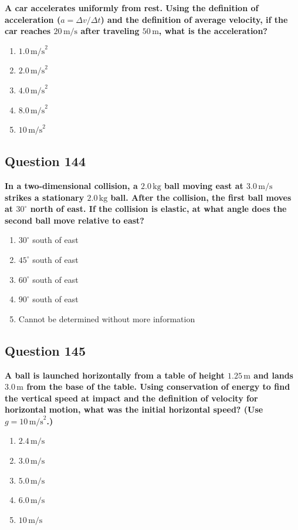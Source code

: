 \documentclass[12pt,letterpaper]{article}
\begin{document}
\begin{questionbox}
\textbf{A car accelerates uniformly from rest. Using the definition of acceleration ($a = \Delta v/\Delta t$) and the definition of average velocity, if the car reaches $20\,\text{m/s}$ after traveling $50\,\text{m}$, what is the acceleration?}

\begin{enumerate}[label=\alph*)]
    \item $1.0\,\text{m/s}^2$
    \item $2.0\,\text{m/s}^2$
    \item $4.0\,\text{m/s}^2$
    \item $8.0\,\text{m/s}^2$
    \item $10\,\text{m/s}^2$
\end{enumerate}
\end{questionbox}

\subsection{Question 144}

\begin{questionbox}
\textbf{In a two-dimensional collision, a $2.0\,\text{kg}$ ball moving east at $3.0\,\text{m/s}$ strikes a stationary $2.0\,\text{kg}$ ball. After the collision, the first ball moves at $30^\circ$ north of east. If the collision is elastic, at what angle does the second ball move relative to east?}

\begin{enumerate}[label=\alph*)]
    \item $30^\circ$ south of east
    \item $45^\circ$ south of east
    \item $60^\circ$ south of east
    \item $90^\circ$ south of east
    \item Cannot be determined without more information
\end{enumerate}
\end{questionbox}

\subsection{Question 145}

\begin{questionbox}
\textbf{A ball is launched horizontally from a table of height $1.25\,\text{m}$ and lands $3.0\,\text{m}$ from the base of the table. Using conservation of energy to find the vertical speed at impact and the definition of velocity for horizontal motion, what was the initial horizontal speed? (Use $g = 10\,\text{m/s}^2$.)}

\begin{enumerate}[label=\alph*)]
    \item $2.4\,\text{m/s}$
    \item $3.0\,\text{m/s}$
    \item $5.0\,\text{m/s}$
    \item $6.0\,\text{m/s}$
    \item $10\,\text{m/s}$
\end{enumerate}
\end{questionbox}
\end{document}

